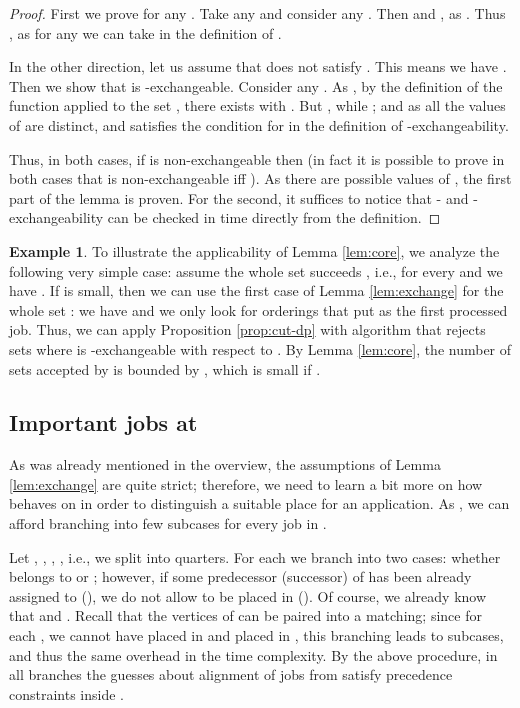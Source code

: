 \documentclass{article}
\theoremstyle{definition}
\newtheorem{example}[theorem]{Example}
\begin{document}
\begin{proof}
First we prove  for any .
Take any  and consider any .
Then   and ,
as .
Thus , as for any  we can take 
in the definition of .

In the other direction, let us assume that  does not satisfy .
This means we have .
Then we show that  is -exchangeable.
Consider any .
As , by the definition of the function  applied to the set ,
 there exists  with
. But , while ;
and as all the values of  are distinct, 
and  satisfies the condition for  in the definition of
-exchangeability.

Thus, in both cases, if  is non-exchangeable then  (in fact it is possible
to prove in both cases that  is non-exchangeable iff ).
As there are  possible values of ,
the first part of the lemma is proven.
For the second, it suffices to notice that - and -exchangeability can be checked
in time  directly from the definition. 
\end{proof}

\begin{example}
To illustrate the applicability of Lemma \ref{lem:core}, we analyze the following very simple case:
assume the whole set  succeeds , i.e., for every  and  we have .
If  is small, then we can use the first case of Lemma \ref{lem:exchange} for the whole set : we have  and we
only look for orderings that put  as the first processed job.
Thus, we can apply Proposition \ref{prop:cut-dp} with algorithm  that rejects sets  where  is -exchangeable with respect to
. By Lemma \ref{lem:core}, the number of sets accepted by  is bounded by ,
which is small if .
\end{example}

\subsection{Important jobs at }\label{sec:half}

As was already mentioned in the overview, the assumptions of Lemma \ref{lem:exchange} are quite strict; therefore, we need to learn a bit more on how  behaves on  in order to distinguish a suitable place for an application. As , we can afford branching into few subcases for every job in .

Let , , , , i.e., we split  into quarters.
For each  we branch into two cases: whether  belongs to  or ;
however, if some predecessor (successor) of  has been already assigned to  (), we do not allow  to be placed in  ().
Of course, we already know that  and .
Recall that the vertices of  can be paired into a matching; since for each ,  we cannot have  placed in 
and  placed in , this branching leads to  subcases, and thus the same overhead in the time complexity.
By the above procedure, in all branches the guesses about alignment of jobs from  satisfy precedence constraints inside .
\end{document}
